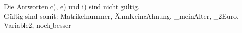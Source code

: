 Die Antworten c), e) und i) sind nicht gültig.\\Gültig sind somit: Matrikelnummer, ÄhmKeineAhnung, {\_}meinAlter, {\_}2Euro, Variable2, noch$\_$besser
